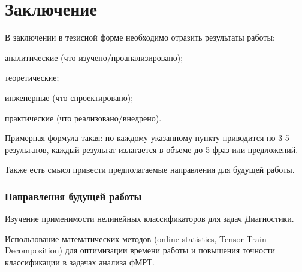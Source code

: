 \chapter*{Заключение}

В заключении в тезисной форме необходимо отразить результаты работы:

\begin{compactitem}
	\item аналитические (что изучено/проанализировано);
	\item теоретические;
	\item инженерные (что спроектировано);
	\item практические (что реализовано/внедрено).
\end{compactitem}

Примерная формула такая: по каждому указанному пункту приводится по 3-5 результатов, каждый результат излагается в объеме до 5 фраз или предложений.

Также есть смысл привести предполагаемые направления для будущей работы.

\subsection*{Направления будущей работы}

\begin{compactitem}
	\item Изучение применимости нелинейных классификаторов для задач Диагностики.
	\item Использование математических методов (online statistics, Tensor-Train Decomposition\cite{oseledets2011tensor}) для оптимизации времени работы и повышения точности классификации в задачах анализа фМРТ.
\end{compactitem}